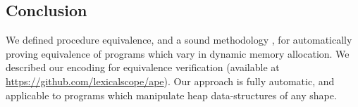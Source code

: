\documentclass[runningheads,a4paper]{llncs}
\begin{document}
\subsection{Conclusion}\label{sec:conclusion}
We defined procedure equivalence, and a sound methodology \metho{}, for automatically proving equivalence of programs which vary in dynamic memory allocation. We described our \metho{} encoding \tool{} for equivalence verification (available at \url{https://github.com/lexicalscope/ape}). Our approach is fully automatic, and applicable to programs which manipulate heap data-structures of any shape.
\printbibliography
\end{document}
